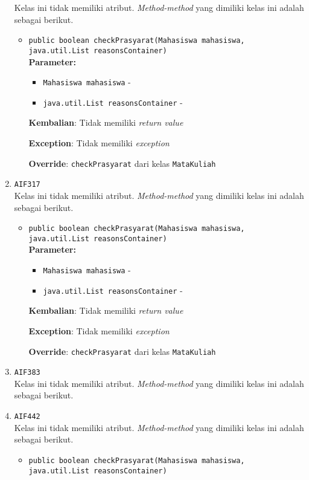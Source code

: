 \documentclass{article}
\begin{document}
\begin{enumerate}
Kelas ini tidak memiliki atribut. \textit{Method-method} yang dimiliki kelas ini adalah sebagai berikut.
\begin{itemize}
\item \texttt{public boolean checkPrasyarat(Mahasiswa mahasiswa, java.util.List reasonsContainer)}\\ 


\textbf{Parameter:}\begin{itemize}
\item \texttt{Mahasiswa mahasiswa} - 
\item \texttt{java.util.List reasonsContainer} - 
\end{itemize}
\textbf{Kembalian}: Tidak memiliki \textit{return value}

\textbf{Exception}: Tidak memiliki \textit{exception}

\textbf{Override}: \texttt{checkPrasyarat} dari kelas \texttt{MataKuliah}

\end{itemize}
\item \texttt{AIF317}\\ 
Kelas ini tidak memiliki atribut. \textit{Method-method} yang dimiliki kelas ini adalah sebagai berikut.
\begin{itemize}
\item \texttt{public boolean checkPrasyarat(Mahasiswa mahasiswa, java.util.List reasonsContainer)}\\ 


\textbf{Parameter:}\begin{itemize}
\item \texttt{Mahasiswa mahasiswa} - 
\item \texttt{java.util.List reasonsContainer} - 
\end{itemize}
\textbf{Kembalian}: Tidak memiliki \textit{return value}

\textbf{Exception}: Tidak memiliki \textit{exception}

\textbf{Override}: \texttt{checkPrasyarat} dari kelas \texttt{MataKuliah}

\end{itemize}
\item \texttt{AIF383}\\ 
Kelas ini tidak memiliki atribut. \textit{Method-method} yang dimiliki kelas ini adalah sebagai berikut.
\begin{itemize}
\end{itemize}
\item \texttt{AIF442}\\ 
Kelas ini tidak memiliki atribut. \textit{Method-method} yang dimiliki kelas ini adalah sebagai berikut.
\begin{itemize}
\item \texttt{public boolean checkPrasyarat(Mahasiswa mahasiswa, java.util.List reasonsContainer)}\\ 



\end{itemize}
\end{enumerate}
\end{document}
